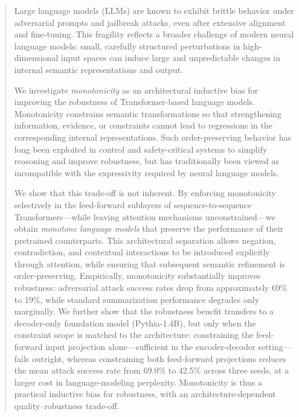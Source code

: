 \documentclass{article}
\theoremstyle{plain}
\theoremstyle{definition}
\theoremstyle{remark}
\begin{document}
\begin{abstract}

Large language models (LLMs) are known to exhibit brittle behavior under adversarial prompts and jailbreak attacks, even after extensive alignment and fine-tuning. This fragility reflects a broader challenge of modern neural language models: small, carefully structured perturbations in high-dimensional input spaces can induce large and unpredictable changes in internal semantic representations and output.

We investigate \emph{monotonicity} as an architectural inductive bias for improving the robustness of Transformer-based language models. Monotonicity constrains semantic transformations so that strengthening information, evidence, or constraints cannot lead to regressions in the corresponding internal representations. Such order-preserving behavior has long been exploited in control and safety-critical systems to simplify reasoning and improve robustness, but has traditionally been viewed as incompatible with the expressivity required by neural language models.

We show that this trade-off is not inherent. By enforcing monotonicity selectively in the feed-forward sublayers of sequence-to-sequence Transformers—while leaving attention mechanisms unconstrained—we obtain \emph{monotone language models} that preserve the performance of their pretrained counterparts. This architectural separation allows negation, contradiction, and contextual interactions to be introduced explicitly through attention, while ensuring that subsequent semantic refinement is order-preserving. Empirically, monotonicity substantially improves robustness: adversarial attack success rates drop from approximately 69\% to 19\%, while standard summarization performance degrades only marginally. We further show that the robustness benefit transfers to a decoder-only foundation model (Pythia-1.4B), but only when the constraint scope is matched to the architecture: constraining the feed-forward input projection alone—sufficient in the encoder-decoder setting—fails outright, whereas constraining both feed-forward projections reduces the mean attack success rate from 69.0\% to 42.5\% across three seeds, at a larger cost in language-modeling perplexity. Monotonicity is thus a practical inductive bias for robustness, with an architecture-dependent quality--robustness trade-off.

\end{abstract}
\end{document}
